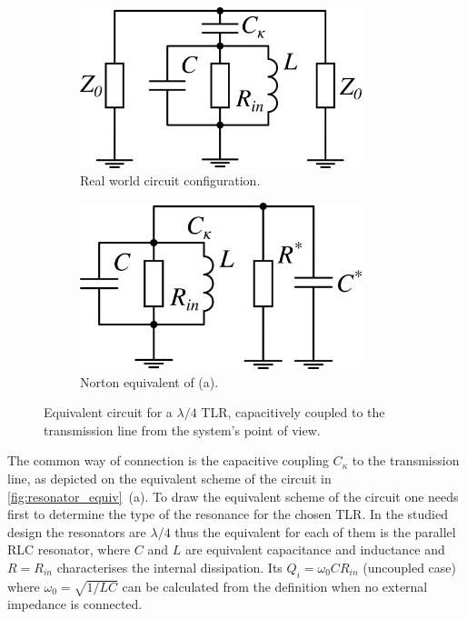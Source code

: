 \documentclass[12pt]{report}
\numberwithin{equation}{section}
\begin{document}
\begin{figure}
\captionsetup[subfigure]{width = 0.9\textwidth, justification=normal}
\centering
\begin{subfigure}[t]{0.48\textwidth}
\centering
\includegraphics[width=0.9\textwidth]{resonator}
\caption{Real world circuit configuration.}
\end{subfigure}
\begin{subfigure}[t]{0.48\textwidth}
\centering
\includegraphics[width=0.9\textwidth]{resonator_equiv}
\caption{Norton equivalent of (a).}
\end{subfigure}

\caption{Equivalent circuit for a $\lambda/4$ TLR, capacitively coupled to the transmission line from the system's point of view.}
\label{fig:resonator_equiv}
\end{figure}

The common way of connection is the capacitive coupling $C_\kappa$ to the transmission line, as depicted on the equivalent scheme of the circuit in \autoref{fig:resonator_equiv}~(a). To draw the equivalent scheme of the circuit one needs first to determine the type of the resonance for the chosen TLR\cite{pozar2012}. In the studied design the resonators are $\lambda/4$ thus the equivalent for each of them is the parallel RLC resonator, where $C$ and $L$ are equivalent capacitance and inductance and $R=R_{in}$ characterises the internal dissipation. Its $Q_i  = \omega_0	C R_{in}$ (uncoupled case) where $\omega_0 = \sqrt{1/LC}$ can be calculated from the definition when no external impedance is connected.
 
\end{document}

